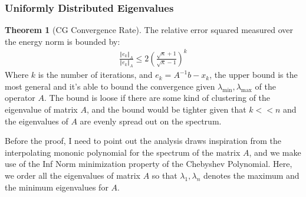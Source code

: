\documentclass[]{article}
\theoremstyle{definition}
\newtheorem{theorem}{Theorem}            %
\begin{document}
        \subsubsection{Uniformly Distributed Eigenvalues}
            \begin{theorem}[CG Convergence Rate]\label{theorem:CG_Convergence_Rate}
                The relative error squared measured over the energy norm is bounded by: 
                \begin{align}
                    \frac{\Vert e_k\Vert_A}{\Vert e_k\Vert_A}
                    \le 2 \left(
                            \frac{\sqrt{\kappa} + 1}{\sqrt{\kappa} - 1}
                    \right)^k
                \end{align}
                Where $k$ is the number of iterations, and $e_k = A^{-1}b - x_k$, the upper bound is the most general and it's able to bound the convergence given $\lambda_{\min}, \lambda_{\max}$ of the operator $A$. The bound is loose if there are some kind of clustering of the eigenvalue of matrix $A$, and the bound would be tighter given that $k<<n$ and the eigenvalues of $A$ are evenly spread out on the spectrum. 
            \end{theorem}
            Before the proof, I need to point out the analysis draws inspiration from the interpolating mononic polynomial for the spectrum of the matrix $A$, and we make use of the Inf Norm minimization property of the Chebyshev Polynomial. Here, we order all the eigenvalues of matrix $A$ so that $\lambda_1, \lambda_n$ denotes the maximum and the minimum eigenvalues for $A$. 
\end{document}
